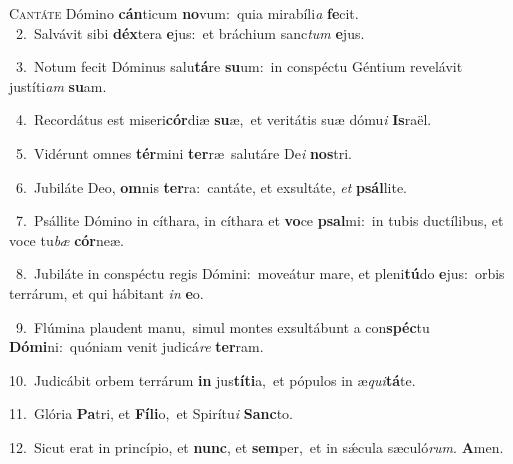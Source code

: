 \lettrine{\initial\textcolor{\initialcolor}{C}}{antáte} Dómino \textbf{cán}\-ticum \textbf{no}\-vum:~\star quia mirabíli\textit{a} \textbf{fe}\-cit.\\
{\numbfont\textcolor{\numbcolor}{~2.}}~Salvávit sibi \textbf{déx}\-tera \textbf{e}\-jus:~\star et bráchium sanc\textit{tum} \textbf{e}\-jus.\par
{\numbfont\textcolor{\numbcolor}{~3.}}~Notum fecit Dóminus salu\-\textbf{tá}\-re \textbf{su}\-um:~\star in conspéctu Géntium revelávit justíti\textit{am} \textbf{su}\-am.\par
{\numbfont\textcolor{\numbcolor}{~4.}}~Recordátus est miseri\-\textbf{cór}\-diæ \textbf{su}\-æ,~\star et veritátis suæ dómu\textit{i} \textbf{Is}\-raël.\par
{\numbfont\textcolor{\numbcolor}{~5.}}~Vidérunt omnes \textbf{tér}\-mini \textbf{ter}\-ræ~\star salutáre De\textit{i} \textbf{nos}\-tri.\par
{\numbfont\textcolor{\numbcolor}{~6.}}~Jubiláte Deo, \textbf{om}\-nis \textbf{ter}\-ra:~\star cantáte, et exsultáte, \textit{et} \textbf{psál}\-lite.\par
{\numbfont\textcolor{\numbcolor}{~7.}}~Psállite Dómino in cíthara, in cíthara et \textbf{vo}\-ce \textbf{psal}\-mi:~\star in tubis ductílibus, et voce tu\textit{bæ} \textbf{cór}\-neæ.\par
{\numbfont\textcolor{\numbcolor}{~8.}}~Jubiláte in conspéctu regis Dómini:~\dagger moveátur mare, et pleni\-\textbf{tú}\-do \textbf{e}\-jus:~\star orbis terrárum, et qui hábitant \textit{in} \textbf{e}\-o.\par
{\numbfont\textcolor{\numbcolor}{~9.}}~Flúmina plaudent manu,~\dagger simul montes exsultábunt a con\-\textbf{spéc}\-tu \textbf{Dó}\-\textbf{mi}ni:~\star quóniam venit judicá\textit{re} \textbf{ter}\-ram.\par
{\numbfont\textcolor{\numbcolor}{10.}}~Judicábit orbem terrárum \textbf{in} jus\-\textbf{tí}\-\textbf{ti}a,~\star et pópulos in æ\-\textit{qui}\-\textbf{tá}te.\par
{\numbfont\textcolor{\numbcolor}{11.}}~Glória \textbf{Pa}\-tri, et \textbf{Fí}\-\textbf{li}o,~\star et Spirítu\textit{i} \textbf{Sanc}\-to.\par
{\numbfont\textcolor{\numbcolor}{12.}}~Sicut erat in princípio, et \textbf{nunc}\-, et \textbf{sem}\-per,~\star et in sǽcula sæculó\-\textit{rum}\-. \textbf{A}\-men.\par
